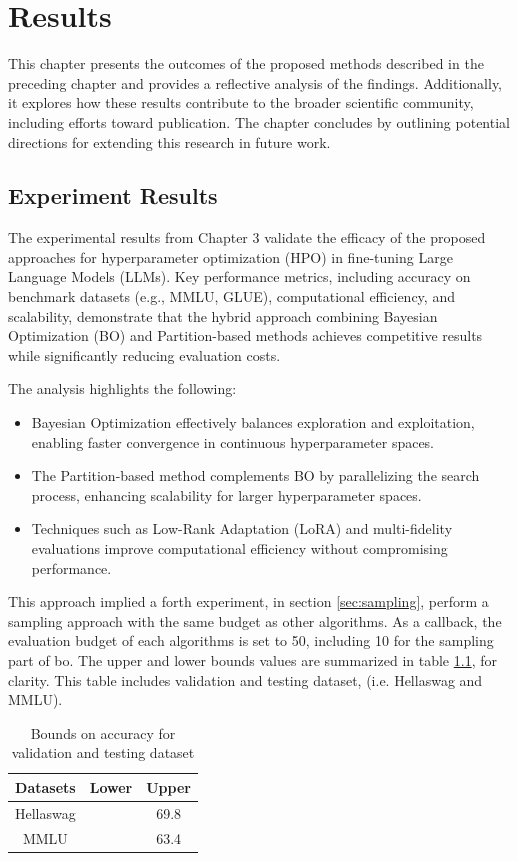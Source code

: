 \chapter{Results}
\label{chap:results}
This chapter presents the outcomes of the proposed methods described in the preceding chapter and provides a reflective analysis of the findings. Additionally, it explores how these results contribute to the broader scientific community, including efforts toward publication. The chapter concludes by outlining potential directions for extending this research in future work.

\section{Experiment Results}
\label{sec:exp_results}
The experimental results from Chapter 3 validate the efficacy of the proposed approaches for hyperparameter optimization (HPO) in fine-tuning Large Language Models (LLMs). Key performance metrics, including accuracy on benchmark datasets (e.g., MMLU, GLUE), computational efficiency, and scalability, demonstrate that the hybrid approach combining Bayesian Optimization (BO) and Partition-based methods achieves competitive results while significantly reducing evaluation costs.

The analysis highlights the following:
\begin{itemize}
    \item Bayesian Optimization effectively balances exploration and exploitation, enabling faster convergence in continuous hyperparameter spaces.
    \item The Partition-based method complements BO by parallelizing the search process, enhancing scalability for larger hyperparameter spaces.
    \item Techniques such as Low-Rank Adaptation (LoRA) and multi-fidelity evaluations improve computational efficiency without compromising performance.
\end{itemize}
This approach implied a forth experiment, in section \ref{sec:sampling}, perform a sampling approach with the same budget as other algorithms. As a callback, the evaluation budget of each algorithms is set to 50, including 10 for the sampling part of \acrshort{bo}. The upper and lower bounds values are summarized in table \ref{tab:bounds}, for clarity. This table includes validation and testing dataset, (i.e. Hellaswag and MMLU).


\begin{table}[h]
    \centering
    \begin{tabular}{|c||c|c|}
    \hline
       Datasets  & Lower & Upper \\
    \hline
       Hellaswag  & & 69.8\\
       MMLU & & 63.4\\
    \hline
    \end{tabular}
    \caption{Bounds on accuracy for validation and testing dataset}
    \label{tab:bounds}
\end{table}


